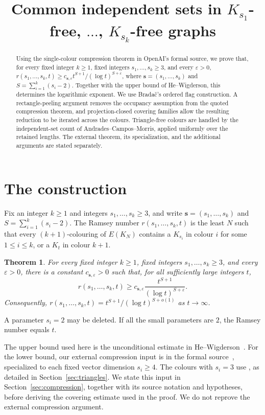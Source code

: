 \documentclass[11pt,a4paper]{article}
\title{Common independent sets in $K_{s_1}$-free, $\ldots$, $K_{s_k}$-free graphs}
\author{}
\date{}
\numberwithin{equation}{section}
\newtheorem{theorem}{Theorem}
\newcommand{\eps}{\varepsilon}
\newcommand{\src}[1]{\texttt{\detokenize{#1}}}
\newcommand{\oairoot}{https://github.com/openai/math/blob/adc7f1241b42e322a6451854ab7e4b4c146bf78a/lean/OAI/Combinatorics/SharpRamsey/}
\newcommand{\source}[2]{\href{\oairoot#1}{\src{#2}}}
\begin{document}
\maketitle
\vspace{-2em}

\begin{abstract}
Using the single-colour compression theorem in OpenAI's formal source,
we prove that, for every fixed integer $k\ge1$, fixed integers
$s_1,\ldots,s_k\ge3$, and every $\eps>0$,
$r(s_1,\ldots,s_k,t)
\ge c_{\boldsymbol{s},\eps}t^{S+1}/(\log t)^{S+\eps}$,
where $\boldsymbol{s}=(s_1,\ldots,s_k)$ and
$S=\sum_{i=1}^k(s_i-2)$.
Together with the upper bound of He--Wigderson, this determines the
logarithmic exponent. We use Brada\v{c}'s ordered flag construction.
A rectangle-peeling argument removes the occupancy assumption from the
quoted compression theorem, and projection-closed covering families
allow the resulting reduction to be iterated across the colours.
Triangle-free colours are handled by the independent-set count of
Andrades--Campos--Morris, applied uniformly over the retained lengths.
The external theorem, its specialization, and the additional arguments
are stated separately.
\end{abstract}

\section{The construction}

Fix an integer $k\ge1$ and integers $s_1,\ldots,s_k\ge3$, and write
$\boldsymbol{s}=(s_1,\ldots,s_k)$ and $S=\sum_{i=1}^k(s_i-2)$.
The Ramsey number $r(s_1,\ldots,s_k,t)$ is the least $N$
such that every $(k+1)$-colouring of $E(K_N)$ contains a
$K_{s_i}$ in colour $i$ for some $1\le i\le k$, or a $K_t$
in colour $k+1$.

\begin{theorem}\label{thm:main}
For every fixed integer $k\ge1$, fixed integers $s_1,\ldots,s_k\ge3$,
and every $\eps>0$, there is a constant
$c_{\boldsymbol{s},\eps}>0$ such that, for all sufficiently large integers $t$,
\[
 r(s_1,\ldots,s_k,t)
 \ge c_{\boldsymbol{s},\eps}\frac{t^{S+1}}{(\log t)^{S+\eps}}.
\]
Consequently,
$r(s_1,\ldots,s_k,t)=t^{S+1}/(\log t)^{S+o(1)}$ as $t\to\infty$.
\end{theorem}

A parameter $s_i=2$ may be deleted. If all the small parameters
are $2$, the Ramsey number equals $t$.

The upper bound used here is the unconditional estimate in
He--Wigderson~\cite[Appendix~B]{HW}.
For the lower bound, our external compression input is
\source{Marking/SelectedStep.lean}{eventually_selected_step}
in the formal source~\cite{OAI}, specialized to each fixed vector
dimension $s_i\ge4$. The colours with $s_i=3$ use
\cite[Theorem~1.3]{ACM}, as detailed in Section~\ref{sec:triangles}.
We state this input in Section~\ref{sec:compression}, together with
its source notation and hypotheses, before deriving the covering
estimate used in the proof. We do not reprove the external compression
argument.
\end{document}
